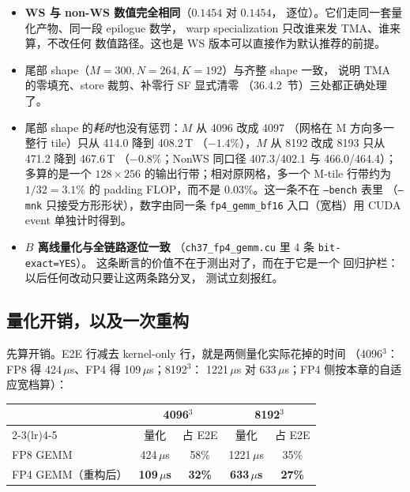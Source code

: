 \begin{itemize}[itemsep=2pt,topsep=3pt]
  \item \textbf{WS 与 non-WS 数值完全相同}（$0.1454$ 对 $0.1454$，
        逐位）。它们走同一套量化产物、同一段 epilogue 数学，
        warp specialization 只改谁来发 TMA、谁来算，不改任何
        数值路径。这也是 WS 版本可以直接作为默认推荐的前提。
  \item 尾部 shape（$M{=}300,N{=}264,K{=}192$）与齐整 shape 一致，
        说明 TMA 的零填充、store 裁剪、补零行 SF 显式清零
        （36.4.2~节）三处都正确处理了。
  \item 尾部 shape 的\emph{耗时}也没有惩罚：$M$ 从 4096 改成 4097
        （网格在 M 方向多一整行 tile）只从 414.0 降到 408.2\,T
        （$-1.4\%$），$M$ 从 8192 改成 8193 只从 471.2 降到 467.6\,T
        （$-0.8\%$；NonWS 同口径 407.3/402.1 与 466.0/464.4）；
        多算的是一个 $128{\times}256$ 的输出行带；相对原网格，多一个 M-tile 行带约为
        $1/32=3.1\%$ 的 padding FLOP，而不是 $0.03\%$。这一条不在 \texttt{--bench} 表里
        （\texttt{--mnk} 只接受方形形状），数字由同一条
        \texttt{fp4\_gemm\_bf16} 入口（宽档）用 CUDA event 单独计时得到。
  \item \textbf{$B$ 离线量化与全链路逐位一致}
        （\texttt{ch37\_fp4\_gemm.cu} 里 4 条 \texttt{bit-exact=YES}）。
        这条断言的价值不在于测出对了，而在于它是一个
        回归护栏：以后任何改动只要让这两条路分叉，
        测试立刻报红。
\end{itemize}

\subsection{量化开销，以及一次重构}

先算开销。E2E 行减去 kernel-only 行，就是两侧量化实际花掉的时间
（4096$^3$：FP8 得 424\,$\mu$s、FP4 得 109\,$\mu$s；8192$^3$：
1221\,$\mu$s 对 633\,$\mu$s；FP4 侧按本章的自适应宽档算）：

\begin{center}
\footnotesize
\begin{tabular}{lcccc}
\toprule
 & \multicolumn{2}{c}{4096$^3$} & \multicolumn{2}{c}{8192$^3$} \\
\cmidrule(lr){2-3}\cmidrule(lr){4-5}
 & 量化 & 占 E2E & 量化 & 占 E2E \\
\midrule
FP8 GEMM & 424\,$\mu$s & 58\% & 1221\,$\mu$s & 35\% \\
FP4 GEMM（重构后） & \textbf{109\,$\mu$s} & \textbf{32\%} &
  \textbf{633\,$\mu$s} & \textbf{27\%} \\
\bottomrule
\end{tabular}
\end{center}

